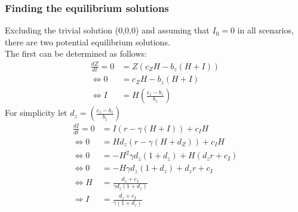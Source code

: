 \documentclass[
	12pt
]{article}
\begin{document}
		\subsubsection{Finding the equilibrium solutions}
			Excluding the trivial solution (0,0,0) and assuming that $I_0=0$ in all scenarios, there are two potential equilibrium solutions.\\
			The first can be determined as follows:		
			\begin{align*}
				\frac{dZ}{dt}= 0 &= Z (c_ZH-b_z(H+I))\\
				\Leftrightarrow 0 &= c_ZH-b_z(H+I) \\
				\Leftrightarrow I &= H \left(\frac{c_z-b_z}{b_z}\right)
			\end{align*}
				For simplicity let $d_z = \left(\frac{c_z-b_z}{b_z}\right)$
			\begin{align*}
				\frac{dI}{dt}= 0 &= I(r-\gamma(H+I))+c_IH \\
				\Leftrightarrow 0&= H d_z \left(r-\gamma \left(H+d_Z\right)\right)+c_I H\\
				\Leftrightarrow 0&= -H^2\gamma d_z(1+d_z) + H\left(d_zr+ c_I\right) \\ 
				\Leftrightarrow 0&= -H \gamma d_z\left(1+d_z\right) +d_z r+ c_I \\
				\Leftrightarrow H &= \frac{d_z +c_I}{\gamma d_z(1+d_z)} \\
				\Rightarrow I &=  \frac{d_z +c_I}{\gamma (1+d_z)} 
			\end{align*}
\end{document}

